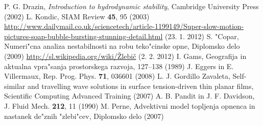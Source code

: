 \documentclass[a4paper,12pt]{article}
\begin{document}
\begin{thebibliography}{3}
   P. G. Drazin, \textit{Introduction to hydrodynamic stability}, Cambridge University Press (2002)
   L. Kondic, SIAM Review \textbf{45}, 95 (2003)
   \url{http://www.dailymail.co.uk/sciencetech/article-1199149/Super-slow-motion-pictures-soap-bubble-bursting-stunning-detail.html} (23. 1. 2012)
   S. "Copar, Numeri"cna analiza nestabilnosti na robu teko"cinske opne, Diplomsko delo (2009)
   \href{http://sl.wikipedia.org/wiki/\%C5\%BDlebi\%C4\%8Di}{http://sl.wikipedia.org/wiki/\v Zlebič} (2. 2. 2012)
   I. Gams, Geografija in aktualna vpra"sanja prostorskega razvoja, 127--138 (1989)
   J. Eggers in E. Villermaux, Rep. Prog. Phys. \textbf{71}, 036601 (2008)
   L. J. Gordillo Zavaleta, Self-similar and travelling wave solutions in surface tension-driven thin planar films, Scientific Computing Advanced Training (2007)
   A. B. Pandit in J. F. Davidson, J. Fluid Mech. \textbf{212}, 11 (1990)
   M. Perne, Advektivni model topljenja opnenca in nastanek de"znih "zlebi"cev, Diplomsko delo (2007)
\end{thebibliography}
\end{document}
